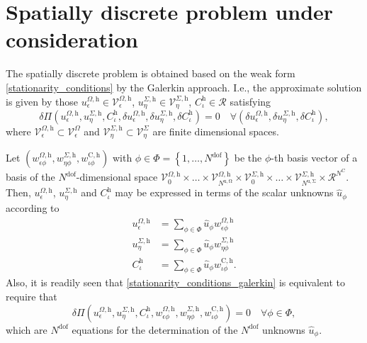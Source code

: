 \documentclass[pdftex,a4paper,12pt,abstracton]{scrartcl}
\begin{document}
\section{Spatially discrete problem under consideration}
The spatially discrete problem is obtained based on the weak form \eqref{stationarity_conditions} by the Galerkin approach. I.e., the approximate solution is given by those $u^{\Omega,\mathrm{h}}_\epsilon \in \mathcal{V}^{\Omega,\mathrm{h}}_\epsilon$, $u^{\Sigma,\mathrm{h}}_\eta \in \mathcal{V}^{\Sigma,\mathrm{h}}_\eta$, $C^\mathrm{h}_\iota \in \mathcal{R}$ satisfying
\begin{equation}
  \delta \Pi(u^{\Omega,\mathrm{h}}_\epsilon, u^{\Sigma,\mathrm{h}}_\eta, C^\mathrm{h}_\iota, \delta u^{\Omega,\mathrm{h}}_\epsilon, \delta u^{\Sigma,\mathrm{h}}_\eta, \delta C^\mathrm{h}_\iota)
  = 0
  \quad \forall (\delta u^{\Omega,\mathrm{h}}_\epsilon, \delta u^{\Sigma,\mathrm{h}}_\eta, \delta C^\mathrm{h}_\iota),
  \label{stationarity_conditions_galerkin}
\end{equation}
where $\mathcal{V}^{\Omega,\mathrm{h}}_\epsilon \subset \mathcal{V}^\Omega_\epsilon$ and $\mathcal{V}^{\Sigma,\mathrm{h}}_\eta \subset \mathcal{V}^\Sigma_\eta$ are finite dimensional spaces.

Let $(w^{\Omega,\mathrm{h}}_{\epsilon \phi}, w^{\Sigma,\mathrm{h}}_{\eta \phi}, w^{\mathrm{C},\mathrm{h}}_{\iota \phi})$ with $\phi \in \Phi=\left\{1, \hdots, N^\mathrm{dof} \right\}$ be the $\phi$-th basis vector of a basis of the $N^\mathrm{dof}$-dimensional space $\mathcal{V}^{\Omega,\mathrm{h}}_0 \times \hdots \times \mathcal{V}^{\Omega,\mathrm{h}}_{N^\mathrm{u,\Omega}} \times \mathcal{V}^{\Sigma,\mathrm{h}}_0 \times \hdots \times \mathcal{V}^{\Sigma,\mathrm{h}}_{N^\mathrm{u,\Sigma}} \times \mathcal{R}^{N^\mathrm{C}}$.
Then, $u^{\Omega,\mathrm{h}}_\epsilon$, $u^{\Sigma,\mathrm{h}}_\eta$ and $C^\mathrm{h}_\iota$ may be expressed in terms of the scalar unknowns $\hat u_\phi$ according to
\begin{equation}
\begin{split}
u^{\Omega,\mathrm{h}}_\epsilon &= \sum_{\phi \in \Phi} \hat u_\phi w^{\Omega,\mathrm{h}}_{\epsilon\phi}\\
u^{\Sigma,\mathrm{h}}_\eta &= \sum_{\phi \in \Phi} \hat u_\phi w^{\Sigma,\mathrm{h}}_{\eta\phi}\\
C^\mathrm{h}_\iota &= \sum_{\phi \in \Phi} \hat u_\phi w^{\mathrm{C},\mathrm{h}}_{\iota\phi}.
\end{split}
\end{equation}
Also, it is readily seen that \eqref{stationarity_conditions_galerkin} is equivalent to require that
\begin{equation}
  \delta \Pi(u^{\Omega,\mathrm{h}}_\epsilon, u^{\Sigma,\mathrm{h}}_\eta, C^\mathrm{h}_\iota, w^{\Omega,\mathrm{h}}_{\epsilon\phi}, w^{\Sigma,\mathrm{h}}_{\eta\phi}, w^{\mathrm{C},\mathrm{h}}_{\iota\phi})
  = 0
  \quad \forall \phi \in \Phi,
  \label{stationarity_conditions_discrete}
\end{equation}
which are $N^\mathrm{dof}$ equations for the determination of the $N^\mathrm{dof}$ unknowns $\hat u_\phi$.
\end{document}
